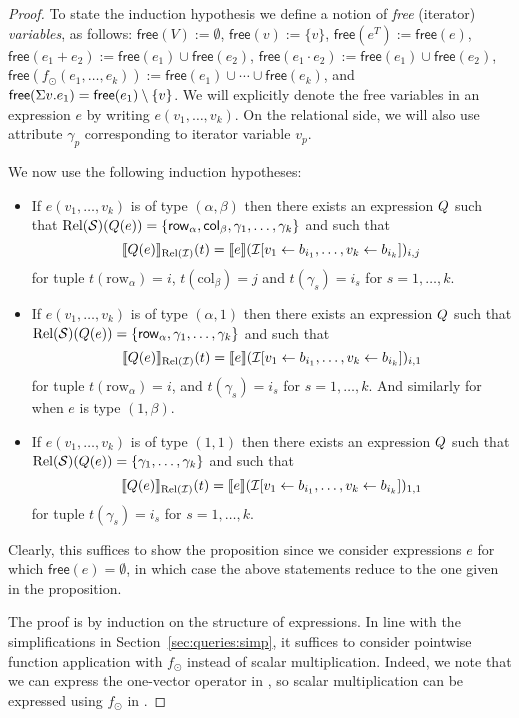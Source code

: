 \begin{proof}
To state the induction hypothesis we define a notion of \textit{free} (iterator) \textit{variables}, as follows:
$\mathsf{free}(V):=\emptyset$, $\mathsf{free}(v):=\{v\}$, $\mathsf{free}(e^T):=\mathsf{free}(e)$, $\mathsf{free}(e_1+e_2):=\mathsf{free}(e_1)\cup \mathsf{free}(e_2)$, $\mathsf{free}(e_1\cdot e_2):=\mathsf{free}(e_1)\cup \mathsf{free}(e_2)$,
 $\mathsf{free}(f_\odot(e_1,\ldots,e_k)):=\mathsf{free}(e_1)\cup\cdots \cup \mathsf{free}(e_k)$, and $\mathsf{free}(\Sigma v. e_1)=\mathsf{free}(e_1)\setminus\{v\}$. We will explicitly denote the free variables in an expression $e$ by writing $e(v_1,\ldots,v_k)$.
On the relational side, we will also use attribute $\gamma_p$ corresponding to iterator variable $v_p$.

We now use the following induction hypotheses:
\begin{itemize}
	\item If $e(v_1,\ldots,v_k)$ is of type $(\alpha,\beta)$ then there exists an
	\rak expression $Q$ such that $\text{Rel}(\mathcal{S})(Q(e))=\{\mathsf{row}_\alpha,\mathsf{col}_\beta,\gamma_1,\ldots,\gamma_k\}$
	and such that 
	$$
	\llbracket Q(e) \rrbracket_{\text{Rel}(\mathcal{I})}(t)=\llbracket e \rrbracket(\mathcal{I}[v_1\gets b_{i_1},\ldots,v_k\gets b_{i_k}])_{i,j}
	$$
	for tuple $t(\mathrm{row}_\alpha)=i$, $t(\mathrm{col}_\beta)=j$ and $t(\gamma_s)=i_s$ for $s=1,\ldots, k$.
	\item If $e(v_1,\ldots,v_k)$ is of type $(\alpha,1)$ then there exists an
	\rak expression $Q$ such that $\text{Rel}(\mathcal{S})(Q(e))=\{\mathsf{row}_\alpha,\gamma_1,\ldots,\gamma_k\}$
	and such that 
	$$
	\llbracket Q(e) \rrbracket_{\text{Rel}(\mathcal{I})}(t)=\llbracket e \rrbracket(\mathcal{I}[v_1\gets b_{i_1},\ldots,v_k\gets b_{i_k}])_{i,1}
	$$
	for tuple $t(\mathrm{row}_\alpha)=i$,  and $t(\gamma_s)=i_s$ for $s=1,\ldots, k$.
	And similarly for when $e$ is type $(1,\beta)$.
	\item If $e(v_1,\ldots,v_k)$ is of type $(1,1)$ then there exists an
	\rak expression $Q$ such that $\text{Rel}(\mathcal{S})(Q(e))=\{\gamma_1,\ldots,\gamma_k\}$
	and such that 
	$$
	\llbracket Q(e) \rrbracket_{\text{Rel}(\mathcal{I})}(t)=\llbracket e \rrbracket(\mathcal{I}[v_1\gets b_{i_1},\ldots,v_k\gets b_{i_k}])_{1,1}
	$$
	for tuple $t(\gamma_s)=i_s$ for $s=1,\ldots, k$.
\end{itemize}
Clearly, this suffices to show the proposition since we consider expressions $e$ for which $\mathsf{free}(e)=\emptyset$, in which case the above statements reduce to the one given in the proposition.


The proof is by induction on the structure of \langsum expressions. In line with the simplifications in Section~\ref{sec:queries:simp}, it suffices to consider pointwise function application with $f_\odot$ instead of scalar multiplication. Indeed, we note that we can express the one-vector operator in \langsum, so scalar multiplication can be expressed using $f_\odot$ in \langsum.


\end{proof}
